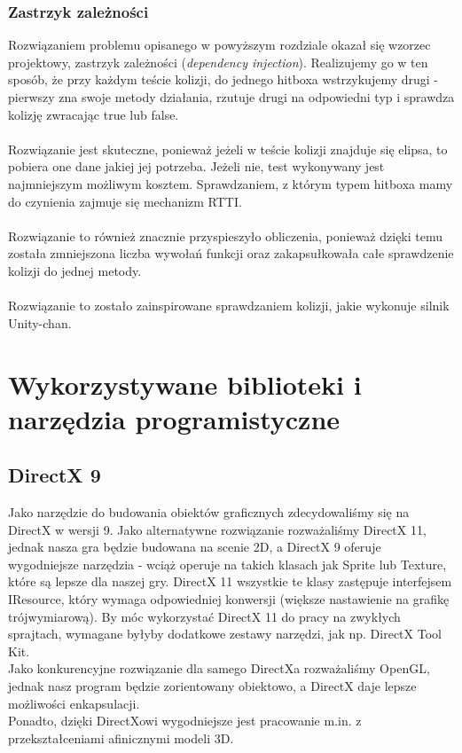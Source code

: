 	\subsubsection{Zastrzyk zależności}
		\indent \indent Rozwiązaniem problemu opisanego w powyższym rozdziale okazał się wzorzec projektowy, zastrzyk zależności (\emph{dependency injection}). Realizujemy go w ten sposób, że przy każdym teście kolizji, do jednego hitboxa wstrzykujemy drugi - pierwszy zna swoje metody działania, rzutuje drugi na odpowiedni typ i sprawdza kolizję zwracając true lub false.\\\\
		\indent Rozwiązanie jest skuteczne, ponieważ jeżeli w teście kolizji znajduje się elipsa, to pobiera one dane jakiej jej potrzeba. Jeżeli nie, test wykonywany jest najmniejszym możliwym kosztem. Sprawdzaniem, z którym typem hitboxa mamy do czynienia zajmuje się mechanizm RTTI.\\\\
		\indent Rozwiązanie to również znacznie przyspieszyło obliczenia, ponieważ dzięki temu została zmniejszona liczba wywołań funkcji oraz zakapsułkowała całe sprawdzenie kolizji do jednej metody.\\\\
		\indent Rozwiązanie to zostało zainspirowane sprawdzaniem kolizji, jakie wykonuje silnik Unity-chan.

\section{Wykorzystywane biblioteki i narzędzia programistyczne}
	\subsection{DirectX 9}
		\indent \indent Jako narzędzie do budowania obiektów graficznych zdecydowaliśmy się na DirectX w wersji 9. Jako alternatywne rozwiązanie rozważaliśmy DirectX 11, jednak nasza gra będzie budowana na scenie 2D, a DirectX 9 oferuje wygodniejsze narzędzia - wciąż operuje na takich klasach jak Sprite lub Texture, które są lepsze dla naszej gry. DirectX 11 wszystkie te klasy zastępuje interfejsem IResource, który wymaga odpowiedniej konwersji (większe nastawienie na grafikę trójwymiarową). By móc wykorzystać DirectX 11 do pracy na zwykłych sprajtach, wymagane byłyby dodatkowe zestawy narzędzi, jak np. DirectX Tool Kit.\\
		Jako konkurencyjne rozwiązanie dla samego DirectXa rozważaliśmy OpenGL, jednak nasz program będzie zorientowany obiektowo, a DirectX daje lepsze możliwości enkapsulacji.\\
		Ponadto, dzięki DirectXowi wygodniejsze jest pracowanie m.in. z przekształceniami afinicznymi modeli 3D.
	
